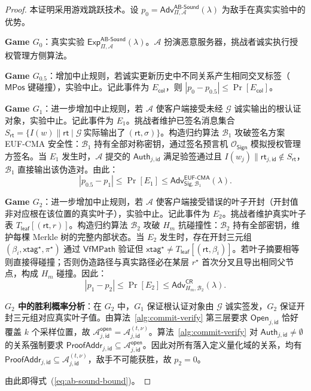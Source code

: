 \begin{proof}
本证明采用游戏跳跃技术。设 $p_0=\mathsf{Adv}_{\Pi,\mathcal{A}}^{\mathsf{AB\text{-}Sound}}(\lambda)$ 为敌手在真实实验中的优势。

\textbf{Game $G_0$}：真实实验 $\mathsf{Exp}_{\Pi,\mathcal{A}}^{\mathsf{AB\text{-}Sound}}(\lambda)$。$\mathcal{A}$ 扮演恶意服务器，挑战者诚实执行授权管理方侧算法。

\textbf{Game $G_{0.5}$}：增加中止规则，若诚实更新历史中不同关系产生相同交叉标签（$\mathsf{MPos}$ 键碰撞），实验中止。记此事件为 $E_{\mathsf{col}}$，则 $|p_0-p_{0.5}|\le\Pr[E_{\mathsf{col}}]$。

\textbf{Game $G_1$}：进一步增加中止规则，若 $\mathcal{A}$ 使客户端接受未经 $\mathcal{G}$ 诚实输出的根认证对象，实验中止。记此事件为 $E_1$。挑战者维护已签名消息集合 $S_{\mathsf{rt}}=\{I(w)\|\mathsf{rt}\mid \mathcal{G}\ \text{实际输出了}\ (\mathsf{rt},\sigma)\}$。构造归约算法 $\mathcal{B}_1$ 攻破签名方案 EUF-CMA 安全性：$\mathcal{B}_1$ 持有全部对称密钥，通过签名预言机 $\mathcal{O}_{\mathsf{Sign}}$ 模拟授权管理方签名。当 $E_1$ 发生时，$\mathcal{A}$ 提交的 $\mathsf{Auth}_{j,\mathsf{id}}$ 满足验签通过且 $I(w_j)\|\mathsf{rt}_{j,\mathsf{id}}\notin S_{\mathsf{rt}}$，$\mathcal{B}_1$ 直接输出该伪造对。由此：
\begin{equation}\label{eq:g0g1}
|p_{0.5}-p_1|\le \Pr[E_1]\le\mathsf{Adv}_{\mathsf{Sig},\mathcal{B}_1}^{\mathsf{EUF\text{-}CMA}}(\lambda).
\end{equation}

\textbf{Game $G_2$}：进一步增加中止规则，若 $\mathcal{A}$ 使客户端接受错误的叶子开封（开封值非对应根在该位置的真实叶子），实验中止。记此事件为 $E_2$。挑战者维护真实叶子表 $T_{\mathsf{leaf}}[(\mathsf{rt},r)]$。构造归约算法 $\mathcal{B}_2$ 攻破 $H_m$ 抗碰撞性：$\mathcal{B}_2$ 持有全部密钥，维护每棵 Merkle 树的完整内部状态。当 $E_2$ 发生时，存在开封三元组 $(\beta_i,\mathsf{xtag}^\star,\pi^\star)$ 通过 $\mathsf{VfMPath}$ 验证但 $\mathsf{xtag}^\star\neq T_{\mathsf{leaf}}[(\mathsf{rt},\beta_i)]$。若叶子摘要相等则直接得碰撞；否则伪造路径与真实路径必在某层 $r^\star$ 首次分叉且导出相同父节点，构成 $H_m$ 碰撞。因此：
\begin{equation}\label{eq:g1g2}
|p_1-p_2|\le \Pr[E_2]\le\mathsf{Adv}_{H_m,\mathcal{B}_2}^{\mathsf{CR}}(\lambda).
\end{equation}

\textbf{$G_2$ 中的胜利概率分析}：在 $G_2$ 中，$G_1$ 保证根认证对象由 $\mathcal{G}$ 诚实签发，$G_2$ 保证开封三元组对应真实叶子值。由算法~\ref{alg:commit-verify} 第三层要求 $\mathsf{Open}_{j,\mathsf{id}}$ 恰好覆盖 $k$ 个采样位置，故 $\mathcal{A}_{j,\mathsf{id}}^{\mathsf{open}}=\mathcal{A}_{j,\mathsf{id}}^{(t,\nu)}$。算法~\ref{alg:commit-verify} 对 $\mathsf{Auth}_{j,\mathsf{id}}\neq\emptyset$ 的关系强制要求 $\mathsf{ProofAddr}_{j,\mathsf{id}}\subseteq\mathcal{A}_{j,\mathsf{id}}^{\mathsf{open}}$。因此对所有落入定义量化域的关系，均有 $\mathsf{ProofAddr}_{j,\mathsf{id}}\subseteq\mathcal{A}_{j,\mathsf{id}}^{(t,\nu)}$，敌手不可能获胜，故 $p_2=0$。

由此即得式~(\ref{eq:ab-sound-bound})。
\end{proof}

